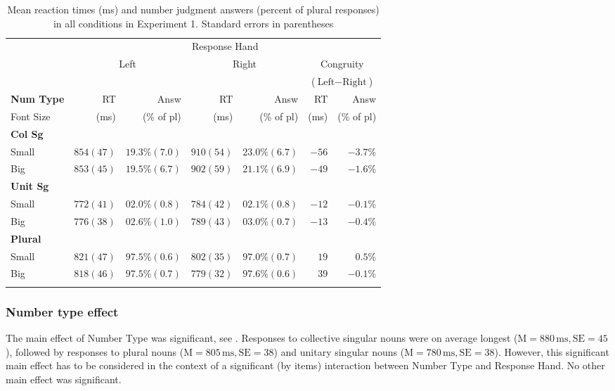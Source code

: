 \documentclass[output=paper]{langscibook}
\begin{document}
\begin{table}[h!]
\caption{Mean reaction times (ms) and number judgment answers (percent of plural responses) in all conditions in Experiment 1. Standard errors in parentheses}
\label{gul-bla:tab:reaction-times-exp1}
\begin{tabularx}{.97\textwidth}{X r@{~~~}r r@{~~~}r r@{~~~}r}
\lsptoprule
&\multicolumn{6}{c}{Response Hand}\\\cmidrule(lr){2-7}
&\multicolumn{2}{c}{\multirow{2}{*}{Left}}&\multicolumn{2}{c}{\multirow{2}{*}{Right}}&\multicolumn{2}{c}{Congruity}\\
&&&&&\multicolumn{2}{c}{($\text{Left}-\text{Right}$)}\\\cmidrule(lr){2-3}\cmidrule(lr){4-5}\cmidrule(lr){6-7}
\textbf{Num Type}&RT&Answ&RT&Answ&RT&Answ\\
\hspace{6pt}Font Size&(ms)&(\% of pl)&(ms)&(\% of pl)&(ms)&(\% of pl)\\\midrule
\textbf{Col Sg}\\
\hspace{6pt}Small& $854 (47)$& $19.3\% (7.0)$& $910 (54)$& $23.0\% (6.7)$& $-56$& $-3.7\%$\\
\hspace{6pt}Big& $853 (45)$& $19.5\% (6.7)$& $902 (59)$& $21.1\% (6.9)$& $-49$& $-1.6\%$\\\tablevspace
\textbf{Unit Sg}\\
\hspace{6pt}Small& $772 (41)$& $02.0\% (0.8)$& $784 (42)$& $02.1\% (0.8)$& $-12$& $-0.1\%$\\
\hspace{6pt}Big& $776 (38)$& $02.6\% (1.0)$& $789 (43)$& $03.0\% (0.7)$& $-13$& $-0.4\%$\\\tablevspace
\textbf{Plural}\\
\hspace{6pt}Small& $821 (47)$& $97.5\% (0.6)$& $802 (35)$& $97.0\% (0.7)$& $19$& $0.5\%$\\
\hspace{6pt}Big& $818 (46)$& $97.5\% (0.7)$& $779 (32)$& $97.6\% (0.6)$& $39$& $-0.1\%$ \\
\lspbottomrule
\end{tabularx}
\end{table}



\subsubsection{Number type effect}
The main effect of Number Type was significant, see . Responses to collective singular nouns were on average longest ($\text{M}=880\,\text{ms}, \text{SE}=45$), followed by responses to plural nouns ($\text{M}=805\,\text{ms}, \text{SE}=38$) and unitary singular nouns ($\text{M}=780\,\text{ms}, \text{SE}=38$). However, this significant main effect has to be considered in the context of a significant (by items) interaction between Number Type and Response Hand. No other main effect was significant.
\end{document}
